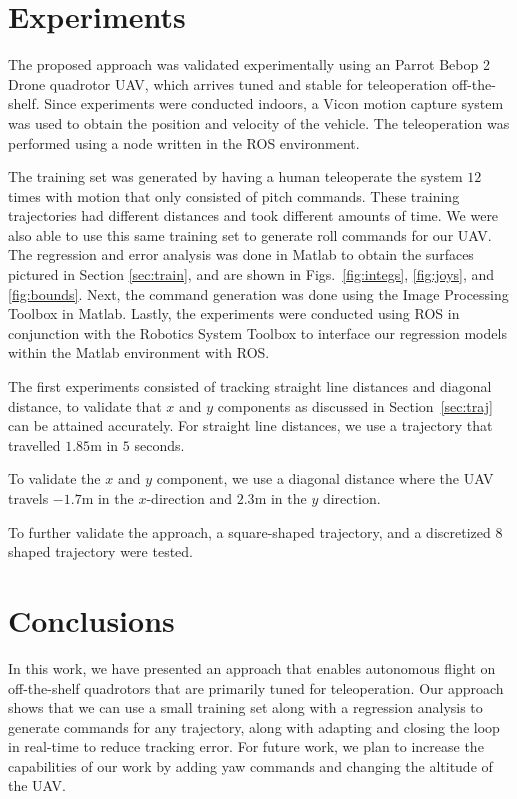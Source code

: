 \documentclass[letterpaper, 10 pt, conference]{ieeeconf}  %
\begin{document}
\section{Experiments} \label{sec:exper}

The proposed approach was validated experimentally using an Parrot Bebop 2 Drone quadrotor UAV, which arrives tuned and stable for teleoperation off-the-shelf. Since experiments were conducted indoors, a Vicon motion capture system was used to obtain the position and velocity of the vehicle. The teleoperation was performed using a node written in the ROS environment.

The training set was generated by having a human teleoperate the system $12$ times with motion that only consisted of pitch commands. These training trajectories had different distances and took different amounts of time. We were also able to use this same training set to generate roll commands for our UAV. The regression and error analysis was done in Matlab to obtain the surfaces pictured in Section \ref{sec:train}, and are shown in Figs.~\ref{fig:integs}, \ref{fig:joys}, and \ref{fig:bounds}. Next, the command generation was done using the Image Processing Toolbox in Matlab. Lastly, the experiments were conducted using ROS in conjunction with the Robotics System Toolbox to interface our regression models within the Matlab environment with ROS.

The first experiments consisted of tracking straight line distances and diagonal distance, to validate that $x$ and $y$ components as discussed in Section~\ref{sec:traj} can be attained accurately. For straight line distances, we use a trajectory that travelled $1.85$m in $5$ seconds.

To validate the $x$ and $y$ component, we use a diagonal distance where the UAV travels $-1.7$m in the $x$-direction and $2.3$m in the $y$ direction.

To further validate the approach, a square-shaped trajectory, and a discretized $8$ shaped trajectory were tested. 




\section{Conclusions} \label{sec:conc}
In this work, we have presented an approach that enables autonomous flight on off-the-shelf quadrotors that are primarily tuned for teleoperation. Our approach shows that we can use a small training set along with a regression analysis to generate commands for any trajectory, along with adapting and closing the loop in real-time to reduce tracking error. For future work, we plan to increase the capabilities of our work by adding yaw commands and changing the altitude of the UAV.
\end{document}
